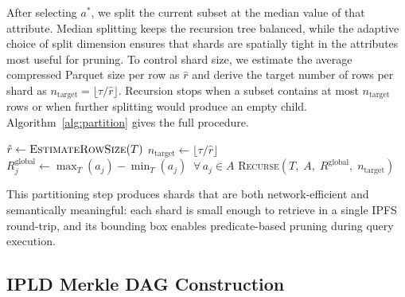 After selecting $a^*$, we split the current subset at the median value of that attribute. Median splitting keeps the recursion tree balanced, while the adaptive choice of split dimension ensures that shards are spatially tight in the attributes most useful for pruning. To control shard size, we estimate the average compressed Parquet size per row as $\hat{r}$ and derive the target number of rows per shard as $n_{\text{target}} = \lfloor \tau / \hat{r} \rfloor$. Recursion stops when a subset contains at most $n_{\text{target}}$ rows or when further splitting would produce an empty child. Algorithm~\ref{alg:partition} gives the full procedure.
 
\begin{algorithm}[t]
\caption{\textsc{Extended-KD-Partition}}
\label{alg:partition}
\DontPrintSemicolon
{}
$\hat{r} \gets \textsc{EstimateRowSize}(T)$\;
$n_{\mathrm{target}} \gets \lfloor \tau / \hat{r} \rfloor$\;
$R^{\mathrm{global}}_j \gets \max_T(a_j) - \min_T(a_j) \;\; \forall \, a_j \in A$\;
\Return \textsc{Recurse}$(T,\; A,\; R^{\mathrm{global}},\; n_{\mathrm{target}})$\;
\end{algorithm}

 
This partitioning step produces shards that are both network-efficient and semantically meaningful: each shard is small enough to retrieve in a single IPFS round-trip, and its bounding box enables predicate-based pruning during query execution.
 
\subsection{IPLD Merkle DAG Construction}
\label{sec:dag_construction}
 
